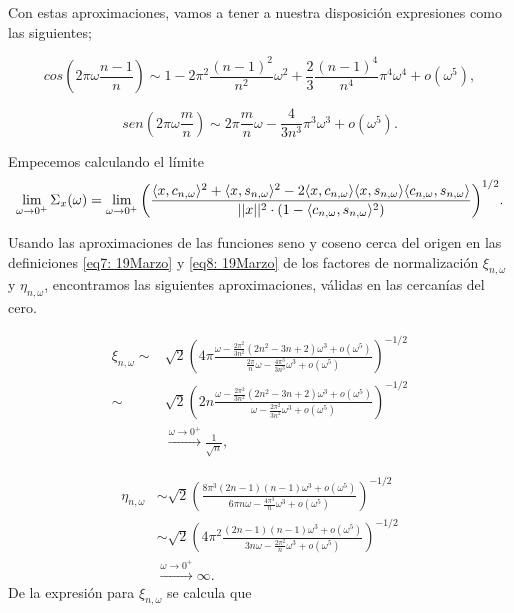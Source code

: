 Con estas aproximaciones, vamos a tener
a nuestra disposición expresiones como las siguientes;

\[
cos\left(
2 \pi \omega \frac{n-1}{n}\right) \sim
1-2\pi^{2}\frac{(n-1)^{2}}{n^{2}} \omega^{2}
+\frac{2}{3} \frac{(n-1)^{4}}{n^{4}} \pi^{4} \omega^{4}
+ o(\omega^{5}),
\]

\[
sen\left(
2 \pi \omega \frac{m}{n}\right) \sim
2 \pi \frac{m}{n} \omega 
- \frac{4}{3n^{3}}\pi^{3} \omega^{3}
+ o(\omega^{5}).
\]

Empecemos calculando 
el límite
\begin{equation}
\label{eq0: 22May}
\lim\limits_{\omega \rightarrow 0^{+}}{
\Sigma_{x}(\omega)}
= \lim\limits_{\omega \rightarrow 0^{+}}{
\left(		  
		  \frac{\langle x, c_{n, \omega } \rangle^{2} +  \langle x, s_{n, \omega } \rangle^{2}	
	       -2  \langle x, c_{n, \omega } \rangle \langle x, s_{n, \omega } \rangle \langle c_{n, \omega }, s_{n, \omega } \rangle}{ || x ||^{2} \cdot
	       (1- \langle c_{n, \omega }, s_{n, \omega } \rangle^{2})}	  
\right) ^{1/2}
}.
\end{equation}


Usando las aproximaciones de las funciones seno y coseno
cerca del origen en 
las definiciones
\eqref{eq7: 19Marzo} y \eqref{eq8: 19Marzo}
de los factores de normalización
$\xi_{n, \omega}$ y $\eta_{n, \omega}$,
encontramos las siguientes aproximaciones,
válidas en las cercanías del cero.
 
\begin{align*}
\xi_{n, \omega} \sim &
\sqrt{2} 
\left(
4 \pi
\frac{                                                                                                                                          
\omega - \frac{2\pi^{2}}{3n^{2}}(2n^2-3n+2)\omega^{3} + o(\omega^{5})
}{
\frac{2\pi}{n} \omega -
\frac{4 \pi^{3}}{3 n^{3}} \omega^{3} + o(\omega^{5})
}
\right)^{-1/2} \\
\sim &
\sqrt{2} 
\left(
2n
\frac{                                                                                                                                          
\omega - \frac{2\pi^{2}}{3n^{2}}(2n^2-3n+2)\omega^{3} + o(\omega^{5})
}{
\omega -
\frac{2 \pi^{2}}{3 n^{2}} \omega^{3} + o(\omega^{5})
}
\right)^{-1/2} \\ &
\xrightarrow{\omega \rightarrow 0^{+}} 
\frac{1}{\sqrt{n}},
\end{align*}

\begin{align*}
\eta_{n, \omega} & \sim 
\sqrt{2} 
\left(
\frac{
8 \pi^{3} (2n-1)(n-1)\omega^{3} + o(\omega^{5})
}{
6 \pi n \omega -
\frac{4 \pi^{3}}{n} \omega^{3} + o(\omega^{5})
}
\right)^{-1/2} \\
& \sim 
\sqrt{2} 
\left(
4\pi^{2}
\frac{
(2n-1)(n-1)\omega^{3} + o(\omega^{5})
}{
3 n \omega -
\frac{2 \pi^{2}}{n} \omega^{3} + o(\omega^{5})
}
\right)^{-1/2}  \\  &
\xrightarrow{\omega \rightarrow 0^{+}} 
\infty.
\end{align*}
De la expresión para $\xi_{n, \omega}$ se calcula que

